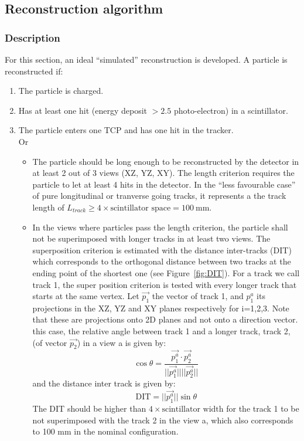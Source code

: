 \subsection{Reconstruction algorithm}
\label{Sec:Reco}
\subsubsection{Description}
For this section, an ideal ``simulated'' reconstruction is developed. A particle is reconstructed if:
\begin{enumerate}
\item The particle is charged.
\item Has at least one hit (energy deposit $> 2.5$ photo-electron) in a scintillator.\\
\item The particle enters one TCP and has one hit in the tracker.\\
  Or\\
  \begin{itemize}
  \item The particle should be long enough to be reconstructed by the detector in at least 2 out of 3 views (XZ, YZ, XY). The length criterion requires the particle to let at least 4 hits in the detector. In the ``less favourable case'' of pure longitudinal or tranverse going tracks, it represents a the track length of $L_{track} \geq  4 \times \text{scintillator space} = 100~$mm.
  \item In the views where particles pass the length criterion, the particle shall not be superimposed with longer tracks in at least two views. The superposition criterion is estimated with the distance inter-tracks (DIT) which corresponds to the orthogonal distance between two tracks at the ending point of the shortest one (see Figure~\ref{fig:DIT}). 
For a track we call track 1, the super position criterion is tested with 
every longer track that
starts at the same vertex. Let $\vec{p_{1}}$ the vector of track 1, and $p_{1}^{a}$ its projections in the XZ, YZ and XY planes respectively for i=1,2,3. Note that these are 
projections onto 2D planes and not onto a direction vector.
this case, the relative angle between track 1 and a longer track, track 2, (of vector 
$\vec{p_{2}}$) in a view a is given by:
\begin{equation}
  \cos \theta = \frac{\vec{p_{1}^{a}} \cdot \vec{p_{2}^{a}}}{||\vec{p_{1}^{a}}|| ||\vec{p_{2}^{a}}||} 
\end{equation}
and the distance inter track is given by:
\begin{equation}
  \text{DIT} = ||\vec{p_{1}^{a}}|| \sin \theta
\end{equation}
The DIT should be higher than $4 \times \text{scintillator width}$ for the track 1 to be not superimposed with the track 2 in the view a, which also corresponds to 100 mm in the nominal configuration.
  \end{itemize} 
\end{enumerate}
